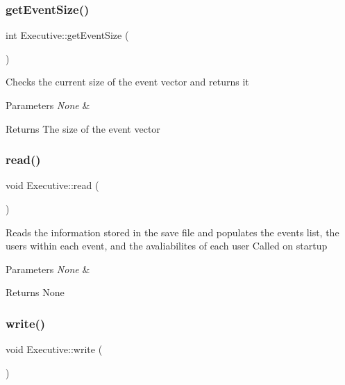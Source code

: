 \subsubsection{\texorpdfstring{get\+Event\+Size()}{getEventSize()}}
{\footnotesize\ttfamily int Executive\+::get\+Event\+Size (\begin{DoxyParamCaption}{ }\end{DoxyParamCaption})}

Checks the current size of the event vector and returns it 
\begin{DoxyParams}{Parameters}
{\em None} & \\
\hline
\end{DoxyParams}
\begin{DoxyReturn}{Returns}
The size of the event vector 
\end{DoxyReturn}
\mbox{\label{class_executive_a222ab3a86234f7476e769a285bf566a4}} 
\subsubsection{\texorpdfstring{read()}{read()}}
{\footnotesize\ttfamily void Executive\+::read (\begin{DoxyParamCaption}{ }\end{DoxyParamCaption})}

Reads the information stored in the save file and populates the events list, the users within each event, and the avaliabilites of each user Called on startup 
\begin{DoxyParams}{Parameters}
{\em None} & \\
\hline
\end{DoxyParams}
\begin{DoxyReturn}{Returns}
None 
\end{DoxyReturn}
\mbox{\label{class_executive_a49841644378cd9bb4b8c1cc2eee04003}} 
\subsubsection{\texorpdfstring{write()}{write()}}
{\footnotesize\ttfamily void Executive\+::write (\begin{DoxyParamCaption}{ }\end{DoxyParamCaption})}

